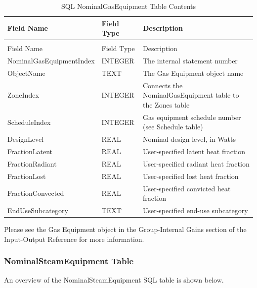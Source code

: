 {\scriptsize
\begin{longtable}[c]{>{\raggedright}p{1.5in}>{\raggedright}p{1.5in}>{\raggedright}p{3.0in}}
\caption{SQL NominalGasEquipment Table Contents \label{table:table-18.-sql-nominalgasequipment-table}} \tabularnewline
\toprule
Field Name & Field Type & Description \tabularnewline
\midrule
\endfirsthead

\caption[]{SQL NominalGasEquipment Table Contents} \tabularnewline
\toprule
Field Name & Field Type & Description \tabularnewline
\midrule
\endhead

Nominal\-Gas\-Equipment\-Index & INTEGER & The internal statement number \tabularnewline
ObjectName & TEXT & The Gas Equipment object name \tabularnewline
ZoneIndex & INTEGER & Connects the NominalGasEquipment table to the Zones table \tabularnewline
ScheduleIndex & INTEGER & Gas equipment schedule number (see Schedule table) \tabularnewline
DesignLevel & REAL & Nominal design level, in Watts \tabularnewline
FractionLatent & REAL & User-specified latent heat fraction \tabularnewline
FractionRadiant & REAL & User-specified radiant heat fraction \tabularnewline
FractionLost & REAL & User-specified lost heat fraction \tabularnewline
FractionConvected & REAL & User-specified convicted heat fraction \tabularnewline
EndUseSubcategory & TEXT & User-specified end-use subcategory \tabularnewline
\bottomrule
\end{longtable}}

Please see the Gas Equipment object in the Group-Internal Gains section of the Input-Output Reference for more information.

\subsubsection{NominalSteamEquipment Table}

An overview of the NominalSteamEquipment SQL table is shown below.

